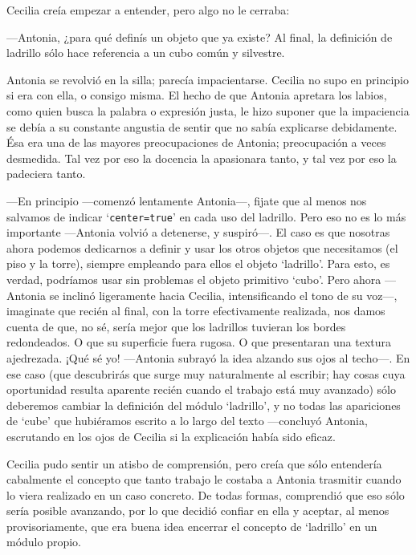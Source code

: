   Cecilia creía empezar a entender, pero algo no le cerraba:
  
  ---Antonia, ¿para qué definís un objeto que ya existe? Al final, la
  definición de ladrillo sólo hace referencia a un cubo común y
  silvestre.

  Antonia se revolvió en la silla; parecía impacientarse. Cecilia no
  supo en principio si era con ella, o consigo misma. El hecho de que
  Antonia apretara los labios, como quien busca la palabra o expresión
  justa, le hizo suponer que la impaciencia se debía a su constante
  angustia de sentir que no sabía explicarse debidamente. Ésa era una
  de las mayores preocupaciones de Antonia; preocupación a veces
  desmedida. Tal vez por eso la docencia la apasionara tanto, y tal
  vez por eso la padeciera tanto.

  ---En principio ---comenzó lentamente Antonia---, fijate que al
  menos nos salvamos de indicar `\lstinline!center=true!' en cada uso
  del ladrillo. Pero eso no es lo más importante ---Antonia volvió a
  detenerse, y suspiró---.  El caso es que nosotras ahora podemos
  dedicarnos a definir y usar los otros objetos que necesitamos (el
  piso y la torre), siempre empleando para ellos el objeto
  `ladrillo'. Para esto, es verdad, podríamos usar sin problemas el
  objeto primitivo `cubo'. Pero ahora ---Antonia se inclinó
  ligeramente hacia Cecilia, intensificando el tono de su voz---,
  imaginate que recién al final, con la torre efectivamente realizada,
  nos damos cuenta de que, no sé, sería mejor que los ladrillos
  tuvieran los bordes redondeados. O que su superficie fuera rugosa. O
  que presentaran una textura ajedrezada. ¡Qué sé yo! ---Antonia
  subrayó la idea alzando sus ojos al techo---. En ese caso (que
  descubrirás que surge muy naturalmente al escribir; hay cosas cuya
  oportunidad resulta aparente recién cuando el trabajo está muy
  avanzado) sólo deberemos cambiar la definición del módulo
  `ladrillo', y no todas las apariciones de `cube' que hubiéramos
  escrito a lo largo del texto ---concluyó Antonia, escrutando en los
  ojos de Cecilia si la explicación había sido eficaz.

  Cecilia pudo sentir un atisbo de comprensión, pero creía que sólo
  entendería cabalmente el concepto que tanto trabajo le costaba a
  Antonia trasmitir cuando lo viera realizado en un caso concreto. De
  todas formas, comprendió que eso sólo sería posible avanzando, por
  lo que decidió confiar en ella y aceptar, al menos provisoriamente,
  que era buena idea encerrar el concepto de `ladrillo' en un módulo
  propio.
  
